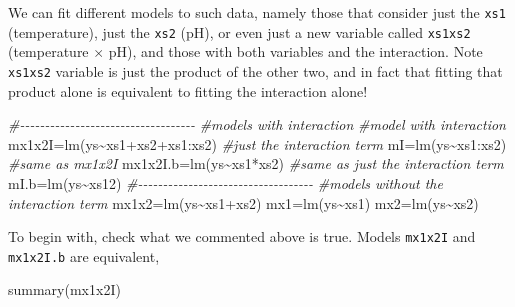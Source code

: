 \documentclass[
]{book}
\newenvironment{Shaded}{\begin{snugshade}}{\end{snugshade}}
\newcommand{\CommentTok}[1]{\textcolor[rgb]{0.56,0.35,0.01}{\textit{#1}}}
\newcommand{\FunctionTok}[1]{\textcolor[rgb]{0.00,0.00,0.00}{#1}}
\newcommand{\NormalTok}[1]{#1}
\newcommand{\OtherTok}[1]{\textcolor[rgb]{0.56,0.35,0.01}{#1}}
\newcommand{\SpecialCharTok}[1]{\textcolor[rgb]{0.00,0.00,0.00}{#1}}
\begin{document}
We can fit different models to such data, namely those that consider just the \texttt{xs1} (temperature), just the \texttt{xs2} (pH), or even just a new variable called \texttt{xs1xs2} (temperature \(\times\) pH), and those with both variables and the interaction. Note \texttt{xs1xs2} variable is just the product of the other two, and in fact that fitting that product alone is equivalent to fitting the interaction alone!

\begin{Shaded}
\begin{Highlighting}[]
\CommentTok{\#{-}{-}{-}{-}{-}{-}{-}{-}{-}{-}{-}{-}{-}{-}{-}{-}{-}{-}{-}{-}{-}{-}{-}{-}{-}{-}{-}{-}{-}{-}{-}{-}{-}{-}{-}}
\CommentTok{\#models with interaction}
\CommentTok{\#model with interaction}
\NormalTok{mx1x2I}\OtherTok{=}\FunctionTok{lm}\NormalTok{(ys}\SpecialCharTok{\textasciitilde{}}\NormalTok{xs1}\SpecialCharTok{+}\NormalTok{xs2}\SpecialCharTok{+}\NormalTok{xs1}\SpecialCharTok{:}\NormalTok{xs2)}
\CommentTok{\#just the interaction term}
\NormalTok{mI}\OtherTok{=}\FunctionTok{lm}\NormalTok{(ys}\SpecialCharTok{\textasciitilde{}}\NormalTok{xs1}\SpecialCharTok{:}\NormalTok{xs2)}
\CommentTok{\#same as mx1x2I}
\NormalTok{mx1x2I.b}\OtherTok{=}\FunctionTok{lm}\NormalTok{(ys}\SpecialCharTok{\textasciitilde{}}\NormalTok{xs1}\SpecialCharTok{*}\NormalTok{xs2)}
\CommentTok{\#same as just the interaction term}
\NormalTok{mI.b}\OtherTok{=}\FunctionTok{lm}\NormalTok{(ys}\SpecialCharTok{\textasciitilde{}}\NormalTok{xs12)}
\CommentTok{\#{-}{-}{-}{-}{-}{-}{-}{-}{-}{-}{-}{-}{-}{-}{-}{-}{-}{-}{-}{-}{-}{-}{-}{-}{-}{-}{-}{-}{-}{-}{-}{-}{-}{-}{-}}
\CommentTok{\#models without the interaction term}
\NormalTok{mx1x2}\OtherTok{=}\FunctionTok{lm}\NormalTok{(ys}\SpecialCharTok{\textasciitilde{}}\NormalTok{xs1}\SpecialCharTok{+}\NormalTok{xs2)}
\NormalTok{mx1}\OtherTok{=}\FunctionTok{lm}\NormalTok{(ys}\SpecialCharTok{\textasciitilde{}}\NormalTok{xs1)}
\NormalTok{mx2}\OtherTok{=}\FunctionTok{lm}\NormalTok{(ys}\SpecialCharTok{\textasciitilde{}}\NormalTok{xs2)}
\end{Highlighting}
\end{Shaded}

To begin with, check what we commented above is true. Models \texttt{mx1x2I} and \texttt{mx1x2I.b} are equivalent,

\begin{Shaded}
\begin{Highlighting}[]
\FunctionTok{summary}\NormalTok{(mx1x2I)}
\end{Highlighting}
\end{Shaded}
\end{document}
